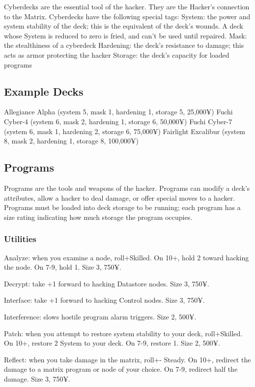 Cyberdecks are the essential tool of the hacker. They are the Hacker’s connection to the Matrix. Cyberdecks have the following special tags:
System: the power and system stability of the deck; this is the equivalent of the deck’s wounds. A deck whose System is reduced to zero is fried, and can’t be used until repaired.
Mask: the stealthiness of a cyberdeck
Hardening: the deck’s resistance to damage; this acts as armor protecting the hacker
Storage: the deck’s capacity for loaded programs


\subsection{Example Decks}

Allegiance Alpha (system 5, mask 1, hardening 1, storage 5, 25,000¥)
Fuchi Cyber-4 (system 6, mask 2, hardening 1, storage 6, 50,000¥)
Fuchi Cyber-7 (system 6, mask 1, hardening 2, storage 6, 75,000¥)
Fairlight Excalibur (system 8, mask 2, hardening 1, storage 8, 100,000¥)


\subsection{Programs}

Programs are the tools and weapons of the hacker. Programs can modify a deck’s attributes, allow a hacker to deal damage, or offer special moves to a hacker. Programs must be loaded into deck storage to be running; each program has a size rating indicating how much storage the program occupies.

\subsubsection{Utilities}
Analyze: when you examine a node, roll+Skilled. On 10+, hold 2 toward hacking the node. On 7-9, hold 1. Size 3, 750¥.

Decrypt: take +1 forward to hacking Datastore nodes. Size 3, 750¥.

Interface: take +1 forward to hacking Control nodes. Size 3, 750¥.

Interference: slows hostile program alarm triggers. Size 2, 500¥.

Patch: when you attempt to restore system stability to your deck, roll+Skilled. On 10+, restore 2 System to your deck. On 7-9, restore 1. Size 2, 500¥.

Reflect: when you take damage in the matrix, roll+- Steady. On 10+, redirect the damage to a matrix program or node of your choice. On 7-9, redirect half the damage. Size 3, 750¥.

